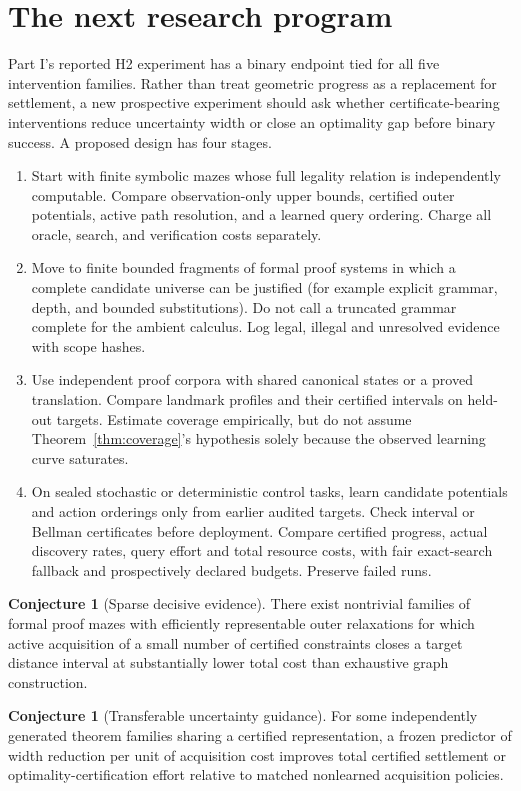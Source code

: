 \documentclass[11pt]{article}
\theoremstyle{definition}\newtheorem{definition}[theorem]{Definition}\newtheorem{example}[theorem]{Example}\newtheorem{conjecture}[theorem]{Conjecture}
\begin{document}
\section{The next research program}
Part I's reported H2 experiment has a binary endpoint tied for all five intervention families. Rather than treat geometric progress as a replacement for settlement, a new prospective experiment should ask whether certificate-bearing interventions reduce uncertainty width or close an optimality gap before binary success. A proposed design has four stages.
\begin{enumerate}[leftmargin=*]
\item Start with finite symbolic mazes whose full legality relation is independently computable. Compare observation-only upper bounds, certified outer potentials, active path resolution, and a learned query ordering. Charge all oracle, search, and verification costs separately.
\item Move to finite bounded fragments of formal proof systems in which a complete candidate universe can be justified (for example explicit grammar, depth, and bounded substitutions). Do not call a truncated grammar complete for the ambient calculus. Log legal, illegal and unresolved evidence with scope hashes.
\item Use independent proof corpora with shared canonical states or a proved translation. Compare landmark profiles and their certified intervals on held-out targets. Estimate coverage empirically, but do not assume Theorem~\ref{thm:coverage}'s hypothesis solely because the observed learning curve saturates.
\item On sealed stochastic or deterministic control tasks, learn candidate potentials and action orderings only from earlier audited targets. Check interval or Bellman certificates before deployment. Compare certified progress, actual discovery rates, query effort and total resource costs, with fair exact-search fallback and prospectively declared budgets. Preserve failed runs.
\end{enumerate}
\begin{conjecture}[Sparse decisive evidence]
There exist nontrivial families of formal proof mazes with efficiently representable outer relaxations for which active acquisition of a small number of certified constraints closes a target distance interval at substantially lower total cost than exhaustive graph construction.
\end{conjecture}
\begin{conjecture}[Transferable uncertainty guidance]
For some independently generated theorem families sharing a certified representation, a frozen predictor of width reduction per unit of acquisition cost improves total certified settlement or optimality-certification effort relative to matched nonlearned acquisition policies.
\end{conjecture}
\end{document}
